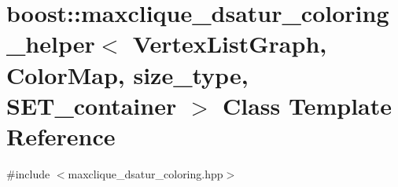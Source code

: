 \hypertarget{classboost_1_1maxclique__dsatur__coloring__helper}{}\section{boost\+:\+:maxclique\+\_\+dsatur\+\_\+coloring\+\_\+helper$<$ Vertex\+List\+Graph, Color\+Map, size\+\_\+type, S\+E\+T\+\_\+container $>$ Class Template Reference}
\label{classboost_1_1maxclique__dsatur__coloring__helper}


{\ttfamily \#include $<$maxclique\+\_\+dsatur\+\_\+coloring.\+hpp$>$}

